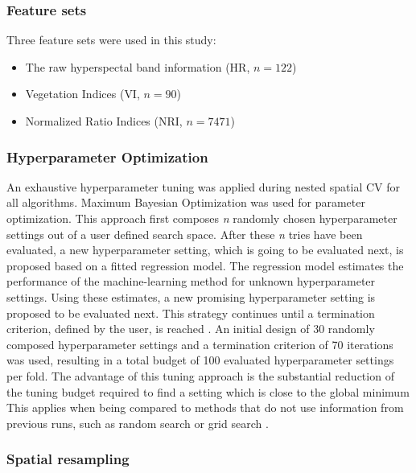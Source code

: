 \documentclass[review]{elsarticle}
\begin{document}
\subsubsection{Feature sets}

Three feature sets were used in this study:

\begin{itemize}
	\item The raw hyperspectal band information (HR, $n = 122$)
	\item Vegetation Indices (\ac{VI}, $n = 90$)
	\item Normalized Ratio Indices (\ac{NRI}, $n = 7471$)
\end{itemize}


\subsubsection{Hyperparameter Optimization}

An exhaustive hyperparameter tuning was applied during nested spatial \ac{CV} for all algorithms.
Maximum Bayesian Optimization \citep{mlrmbo} was used for parameter optimization.
This approach first composes \textit{n} randomly chosen hyperparameter settings out of a user defined search space.
After these \textit{n} tries have been evaluated, a new hyperparameter setting, which is going to be evaluated next, is proposed based on a fitted regression model.
The regression model estimates the performance of the machine-learning method for unknown hyperparameter settings.
Using these estimates, a new promising hyperparameter setting is proposed to be evaluated next.
This strategy continues until a termination criterion, defined by the user, is reached \citep{hutter2011, jones1998}.
An initial design of 30 randomly composed hyperparameter settings and a termination criterion of 70 iterations was used, resulting in a total budget of 100 evaluated hyperparameter settings per fold.
The advantage of this tuning approach is the substantial reduction of the tuning budget required to find a setting which is close to the global minimum
This applies when being compared to methods that do not use information from previous runs, such as random search or grid search \citep{bergstra2012}.

\subsubsection{Spatial resampling}
\end{document}
